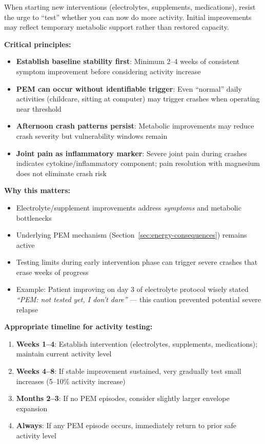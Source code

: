 \begin{warning}
When starting new interventions (electrolytes, supplements, medications), resist the urge to ``test'' whether you can now do more activity. Initial improvements may reflect temporary metabolic support rather than restored capacity.

\textbf{Critical principles:}
\begin{itemize}
    \item \textbf{Establish baseline stability first}: Minimum 2--4 weeks of consistent symptom improvement before considering activity increase
    \item \textbf{PEM can occur without identifiable trigger}: Even ``normal'' daily activities (childcare, sitting at computer) may trigger crashes when operating near threshold
    \item \textbf{Afternoon crash patterns persist}: Metabolic improvements may reduce crash severity but vulnerability windows remain
    \item \textbf{Joint pain as inflammatory marker}: Severe joint pain during crashes indicates cytokine/inflammatory component; pain resolution with magnesium does not eliminate crash risk
\end{itemize}

\textbf{Why this matters:}
\begin{itemize}
    \item Electrolyte/supplement improvements address \emph{symptoms} and metabolic bottlenecks
    \item Underlying PEM mechanism (Section~\ref{sec:energy-consequences}) remains active
    \item Testing limits during early intervention phase can trigger severe crashes that erase weeks of progress
    \item Example: Patient improving on day 3 of electrolyte protocol wisely stated \emph{``PEM: not tested yet, I don't dare''} --- this caution prevented potential severe relapse
\end{itemize}

\textbf{Appropriate timeline for activity testing:}
\begin{enumerate}
    \item \textbf{Weeks 1--4}: Establish intervention (electrolytes, supplements, medications); maintain current activity level
    \item \textbf{Weeks 4--8}: If stable improvement sustained, very gradually test small increases (5--10\% activity increase)
    \item \textbf{Months 2--3}: If no PEM episodes, consider slightly larger envelope expansion
    \item \textbf{Always}: If any PEM episode occurs, immediately return to prior safe activity level
\end{enumerate}
\end{warning}

